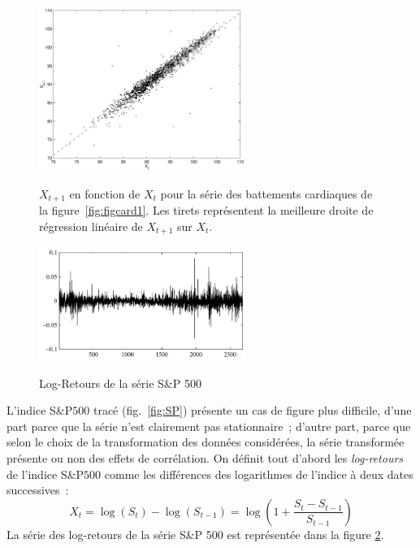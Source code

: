 \begin{figure}
  \centering
  \includegraphics[width=0.6\textwidth]{Figures/cov_hr11839}\\
  \caption{$X_{t+1}$ en fonction de $X_t$ pour la s\'erie
 des battements cardiaques de la figure~\ref{fig:figcard1}. Les tirets
 repr\'esentent la meilleure droite de r\'egression lin\'eaire de $X_{t+1}$ sur $X_t$.}
 \label{fig:xcov}
\end{figure}

\begin{figure}
  \centering
  \includegraphics[width=0.6\textwidth]{Figures/logretourSP}\\
  \caption{Log-Retours de la s\'erie S\&P 500}\label{fig:sp-logretour}
\end{figure}
 L'indice S\&P$500$ trac\'e (fig.~\ref{fig:SP}) pr\'esente un cas de figure plus
 difficile, d'une part parce que la s\'erie n'est clairement pas
 stationnaire~; d'autre part, parce que selon le choix de la transformation des
 donn\'ees consid\'er\'ees, la s\'erie transform\'ee pr\'esente ou non des effets de
 corr\'elation. On d\'efinit tout d'abord les \emph{log-retours} de l'indice
 S\&P$500$ comme les diff\'erences des logarithmes de l'indice \`a deux dates
 successives~:
\[
 X_{t} = \log( S_{t}) - \log(S_{t-1})
      = \log \left( 1 + \frac{S_{t}-S_{t-1}}{S_{t-1}} \right)
\]
La s\'erie des log-retours de la s\'erie S\&P 500 est repr\'esent\'ee dans la
figure \ref{fig:sp-logretour}.


